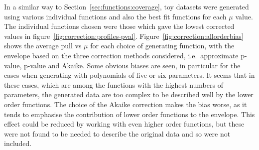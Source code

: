 In a similar way to Section~\ref{sec:functions:coverage}, toy datasets
were generated using various individual functions and also the best fit
functions for each $\mu$ value. The individual functions chosen were those
which gave the lowest corrected \nll values in
figure~\ref{fig:correction:profiles-pval}.
Figure~\ref{fig:correction:allorderbias} shows the average pull vs $\mu$
for each choice of generating function, with the envelope based on the
three correction methods considered, i.e.~approximate p-value, p-value
and Akaike.
Some obvious biases are seen, in particular for the cases when
generating with polynomials of five or six parameters. It seems that in these
cases, which are among the functions with the highest numbers of parameters,
the generated data are too complex to be described well by the lower order
functions. The choice of the Akaike correction makes the bias worse, as it
tends to emphasise the contribution of lower order functions to the envelope.
This effect could be reduced by working with even higher order functions, but
these were not found to be needed to describe the original data and so were
not included.

